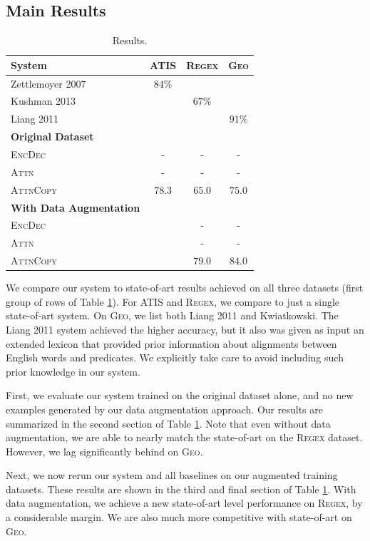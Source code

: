 \documentclass[11pt,letterpaper]{article}
\newcommand{\encdec}{\textsc{EncDec}\xspace}
\newcommand{\attn}{\textsc{Attn}\xspace}
\newcommand{\attncopy}{\textsc{AttnCopy}\xspace}
\newcommand{\atis}{\textsc{ATIS}\xspace}
\newcommand{\regex}{\textsc{Regex}\xspace}
\newcommand{\geo}{\textsc{Geo}\xspace}
\begin{document}
\subsection{Main Results}
\begin{table}[t]
  \centering
  \small
  \begin{tabular}{|l|c|c|c|}
    \hline
    System & \atis & \regex & \geo \\
    \hline
    Zettlemoyer 2007 & $84\%$ & & \\
    Kushman 2013 & & $67\%$ & \\
    Liang 2011 & & & $91\%$ \\
    \hline
    \textbf{Original Dataset} & & & \\
    \encdec & - & - & - \\
    \attn & - & - & - \\
    \attncopy & $78.3$ & $65.0$ & $75.0$ \\
    \hline
    \textbf{With Data Augmentation} & & & \\
    \encdec & & - & - \\
    \attn & & - & - \\
    \attncopy & & $79.0$ & $84.0$ \\
    \hline
  \end{tabular}
  \caption{Results.}
  \label{tab:results}
\end{table}

We compare our system to state-of-art results
achieved on all three datasets (first group of rows of Table \ref{tab:results}).
For \atis and \regex, we compare to just a single state-of-art system.
On \geo, we list both Liang 2011 and Kwiatkowski.
The Liang 2011 system achieved the higher accuracy,
but it also was given as input an extended lexicon that
provided prior information about alignments between 
English words and predicates.  We explicitly take
care to avoid including such prior knowledge in our system.

First, we evaluate our system trained on the original dataset alone,
and no new examples generated by our data augmentation approach.
Our results are summarized in the second section of Table \ref{tab:results}.
Note that even without data augmentation, we are able to nearly
match the state-of-art on the \regex dataset.
However, we lag significantly behind on \geo.

Next, we now rerun our system and all baselines on our
augmented training datasets.  These results are shown in the
third and final section of Table \ref{tab:results}.
With data augmentation, we achieve a new state-of-art level performance
on \regex, by a considerable margin.  We are also much more competitive
with state-of-art on \geo.
\end{document}
